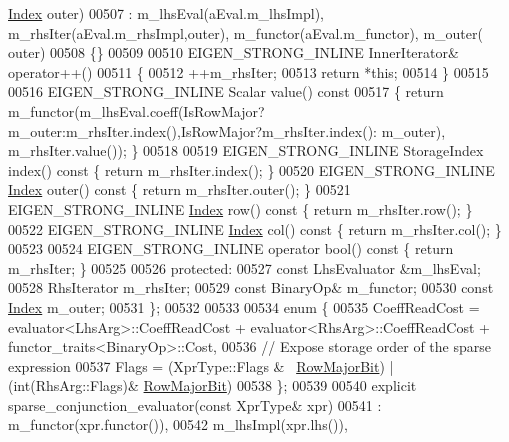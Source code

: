 \begin{DoxyCode}
      \hyperlink{namespace_eigen_a62e77e0933482dafde8fe197d9a2cfde}{Index} outer)
00507       : m\_lhsEval(aEval.m\_lhsImpl), m\_rhsIter(aEval.m\_rhsImpl,outer), m\_functor(aEval.m\_functor), m\_outer(
      outer)
00508     \{\}
00509 
00510     EIGEN\_STRONG\_INLINE InnerIterator& operator++()
00511     \{
00512       ++m\_rhsIter;
00513       \textcolor{keywordflow}{return} *\textcolor{keyword}{this};
00514     \}
00515 
00516     EIGEN\_STRONG\_INLINE Scalar value()\textcolor{keyword}{ const}
00517 \textcolor{keyword}{    }\{ \textcolor{keywordflow}{return} m\_functor(m\_lhsEval.coeff(IsRowMajor?m\_outer:m\_rhsIter.index(),IsRowMajor?m\_rhsIter.index():
      m\_outer), m\_rhsIter.value()); \}
00518 
00519     EIGEN\_STRONG\_INLINE StorageIndex index()\textcolor{keyword}{ const }\{ \textcolor{keywordflow}{return} m\_rhsIter.index(); \}
00520     EIGEN\_STRONG\_INLINE \hyperlink{namespace_eigen_a62e77e0933482dafde8fe197d9a2cfde}{Index} outer()\textcolor{keyword}{ const }\{ \textcolor{keywordflow}{return} m\_rhsIter.outer(); \}
00521     EIGEN\_STRONG\_INLINE \hyperlink{namespace_eigen_a62e77e0933482dafde8fe197d9a2cfde}{Index} row()\textcolor{keyword}{ const }\{ \textcolor{keywordflow}{return} m\_rhsIter.row(); \}
00522     EIGEN\_STRONG\_INLINE \hyperlink{namespace_eigen_a62e77e0933482dafde8fe197d9a2cfde}{Index} col()\textcolor{keyword}{ const }\{ \textcolor{keywordflow}{return} m\_rhsIter.col(); \}
00523 
00524     EIGEN\_STRONG\_INLINE \textcolor{keyword}{operator} bool()\textcolor{keyword}{ const }\{ \textcolor{keywordflow}{return} m\_rhsIter; \}
00525     
00526   \textcolor{keyword}{protected}:
00527     \textcolor{keyword}{const} LhsEvaluator &m\_lhsEval;
00528     RhsIterator m\_rhsIter;
00529     \textcolor{keyword}{const} BinaryOp& m\_functor;
00530     \textcolor{keyword}{const} \hyperlink{namespace_eigen_a62e77e0933482dafde8fe197d9a2cfde}{Index} m\_outer;
00531   \};
00532   
00533   
00534   \textcolor{keyword}{enum} \{
00535     CoeffReadCost = evaluator<LhsArg>::CoeffReadCost + evaluator<RhsArg>::CoeffReadCost + 
      functor\_traits<BinaryOp>::Cost,
00536     \textcolor{comment}{// Expose storage order of the sparse expression}
00537     Flags = (XprType::Flags & ~\hyperlink{group__flags_gae4f56c2a60bbe4bd2e44c5b19cbe8762}{RowMajorBit}) | (\textcolor{keywordtype}{int}(RhsArg::Flags)&
      \hyperlink{group__flags_gae4f56c2a60bbe4bd2e44c5b19cbe8762}{RowMajorBit})
00538   \};
00539   
00540   \textcolor{keyword}{explicit} sparse\_conjunction\_evaluator(\textcolor{keyword}{const} XprType& xpr)
00541     : m\_functor(xpr.functor()),
00542       m\_lhsImpl(xpr.lhs()), 

\end{DoxyCode}

